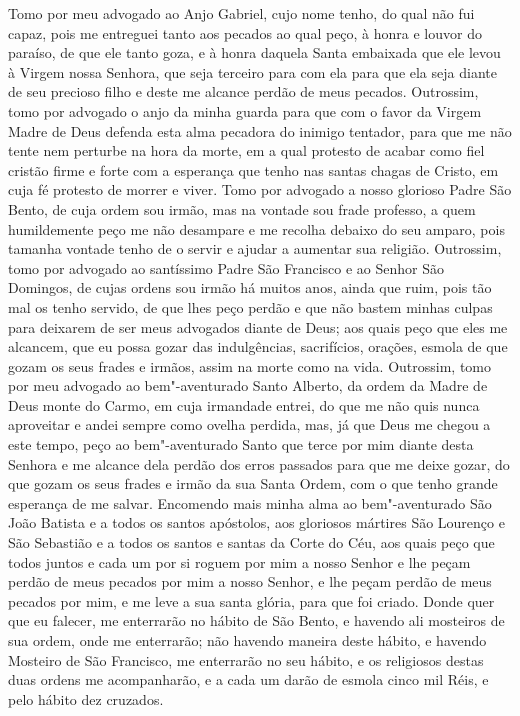 \begin{linenumbers}
Tomo por meu advogado ao Anjo Gabriel, cujo nome tenho, do qual não fui
capaz, pois me entreguei tanto aos pecados ao qual peço, à honra e
louvor do paraíso, de que ele tanto goza, e à honra daquela Santa
embaixada que ele levou à Virgem nossa Senhora, que seja terceiro para
com ela para que ela seja diante de seu precioso filho e deste me
alcance perdão de meus pecados. Outrossim, tomo por advogado o anjo da
minha guarda para que com o favor da Virgem Madre de Deus defenda esta
alma pecadora do inimigo tentador, para que me não tente nem perturbe
na hora da morte, em a qual protesto de acabar como fiel cristão firme
e forte com a esperança que tenho nas santas chagas de Cristo, em cuja
fé protesto de morrer e viver. Tomo por advogado a nosso glorioso Padre
São Bento, de cuja ordem sou irmão, mas na vontade sou frade professo,
a quem humildemente peço me não desampare e me recolha debaixo do seu
amparo, pois tamanha vontade tenho de o servir e ajudar a aumentar sua
religião. Outrossim, tomo por advogado ao santíssimo Padre São
Francisco e ao Senhor São Domingos, de cujas ordens sou irmão há muitos
anos, ainda que ruim, pois tão mal os tenho servido, de que lhes peço
perdão e que não bastem minhas culpas para deixarem de ser meus
advogados diante de Deus; aos quais peço que eles me alcancem, que eu
possa gozar das indulgências, sacrifícios, orações, esmola de que gozam
os seus frades e irmãos, assim na morte como na vida. Outrossim, tomo
por meu advogado ao bem"-aventurado Santo Alberto, da ordem da Madre de
Deus monte do Carmo, em cuja irmandade entrei, do que me não quis nunca
aproveitar e andei sempre como ovelha perdida, mas, já que Deus me
chegou a este tempo, peço ao bem"-aventurado Santo que terce por mim 
diante desta Senhora e me alcance dela perdão dos erros passados para
que me deixe gozar, do que gozam os seus frades e irmão da sua Santa
Ordem, com o que tenho grande esperança de me salvar. Encomendo mais
minha alma ao bem"-aventurado São João Batista e a todos os santos
apóstolos, aos gloriosos mártires São Lourenço e São Sebastião e a
todos os santos e santas da Corte do Céu, aos quais peço que todos
juntos e cada um por si roguem por mim a nosso Senhor e lhe peçam
perdão de meus pecados por mim a nosso Senhor, e lhe peçam perdão de
meus pecados por mim, e me leve a sua santa glória, para que foi
criado. Donde quer que eu falecer, me enterrarão no hábito de São
Bento, e havendo ali mosteiros de sua ordem, onde me enterrarão; não
havendo maneira deste hábito, e havendo Mosteiro de São Francisco, me
enterrarão no seu hábito, e os religiosos destas duas ordens me
acompanharão, e a cada um darão de esmola cinco mil Réis, e pelo hábito
dez cruzados. 


\end{linenumbers}

